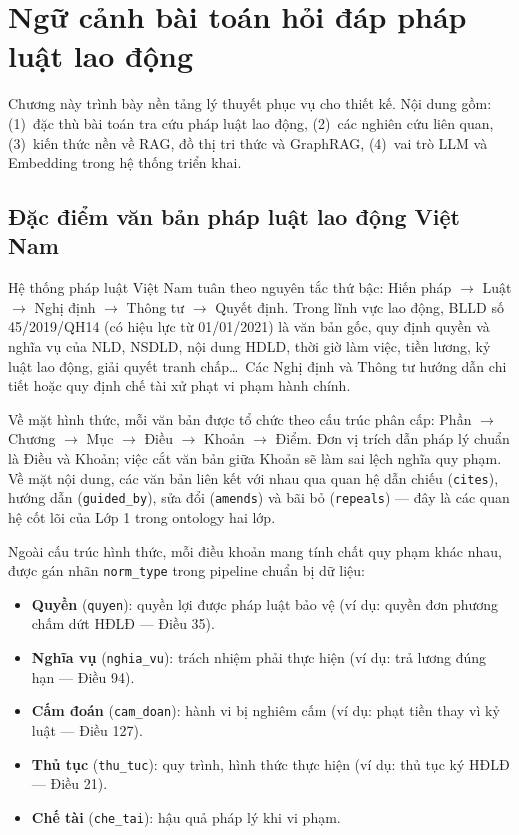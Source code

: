 \documentclass[../DoAn.tex]{subfiles}
\begin{document}
\section{Ngữ cảnh bài toán hỏi đáp pháp luật lao động}
\label{section:2.1}

Chương này trình bày nền tảng lý thuyết phục vụ cho thiết kế. Nội dung gồm: (1)~đặc thù bài toán tra cứu pháp luật lao động, (2)~các nghiên cứu liên quan, (3)~kiến thức nền về \gls{RAG}, đồ thị tri thức và \gls{GraphRAG}, (4)~vai trò \gls{LLM} và \gls{Embedding} trong hệ thống triển khai.

\subsection{Đặc điểm văn bản pháp luật lao động Việt Nam}
\label{subsection:2.1.1}

Hệ thống pháp luật Việt Nam tuân theo nguyên tắc thứ bậc: Hiến pháp $\rightarrow$ Luật $\rightarrow$ Nghị định $\rightarrow$ Thông tư $\rightarrow$ Quyết định. Trong lĩnh vực lao động, \gls{BLLD} số 45/2019/QH14 (có hiệu lực từ 01/01/2021) là văn bản gốc, quy định quyền và nghĩa vụ của \gls{NLD}, \gls{NSDLD}, nội dung \gls{HDLD}, thời giờ làm việc, tiền lương, kỷ luật lao động, giải quyết tranh chấp\ldots\ Các Nghị định và Thông tư hướng dẫn chi tiết hoặc quy định chế tài xử phạt vi phạm hành chính.

Về mặt hình thức, mỗi văn bản được tổ chức theo cấu trúc phân cấp: Phần $\rightarrow$ Chương $\rightarrow$ Mục $\rightarrow$ Điều $\rightarrow$ Khoản $\rightarrow$ Điểm. Đơn vị trích dẫn pháp lý chuẩn là Điều và Khoản; việc cắt văn bản giữa Khoản sẽ làm sai lệch nghĩa quy phạm. Về mặt nội dung, các văn bản liên kết với nhau qua quan hệ dẫn chiếu (\texttt{cites}), hướng dẫn (\texttt{guided\_by}), sửa đổi (\texttt{amends}) và bãi bỏ (\texttt{repeals}) --- đây là các quan hệ cốt lõi của Lớp 1 trong ontology hai lớp.

Ngoài cấu trúc hình thức, mỗi điều khoản mang tính chất quy phạm khác nhau, được gán nhãn \texttt{norm\_type} trong pipeline chuẩn bị dữ liệu:

\begin{itemize}[nosep, leftmargin=*]
    \item \textbf{Quyền} (\texttt{quyen}): quyền lợi được pháp luật bảo vệ (ví dụ: quyền đơn phương chấm dứt HĐLĐ --- Điều 35).
    \item \textbf{Nghĩa vụ} (\texttt{nghia\_vu}): trách nhiệm phải thực hiện (ví dụ: trả lương đúng hạn --- Điều 94).
    \item \textbf{Cấm đoán} (\texttt{cam\_doan}): hành vi bị nghiêm cấm (ví dụ: phạt tiền thay vì kỷ luật --- Điều 127).
    \item \textbf{Thủ tục} (\texttt{thu\_tuc}): quy trình, hình thức thực hiện (ví dụ: thủ tục ký HĐLĐ --- Điều 21).
    \item \textbf{Chế tài} (\texttt{che\_tai}): hậu quả pháp lý khi vi phạm.
\end{itemize}
\end{document}
